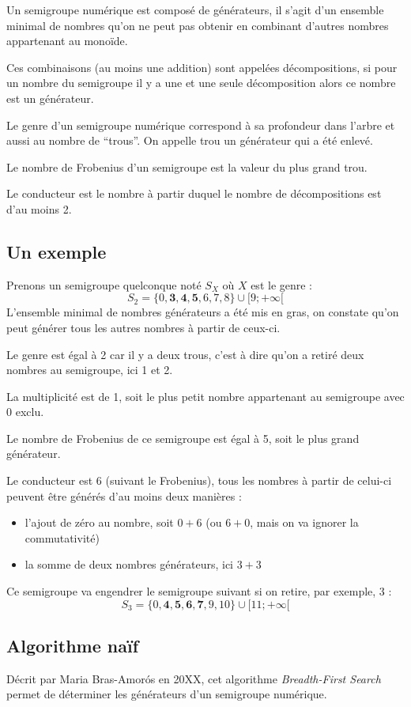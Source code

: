 \documentclass[12pt,a4paper]{article}
\begin{document}
Un semigroupe numérique est composé de générateurs, il s'agit d'un ensemble minimal de nombres qu'on ne peut pas obtenir en combinant d'autres nombres appartenant au monoïde.

Ces combinaisons (au moins une addition) sont appelées décompositions, si pour un nombre du semigroupe il y a une et une seule décomposition alors ce nombre est un générateur.

Le genre d'un semigroupe numérique correspond à sa profondeur dans l'arbre et aussi au nombre de ``trous''. On appelle trou un générateur qui a été enlevé.

Le nombre de Frobenius d'un semigroupe est la valeur du plus grand trou.

Le conducteur est le nombre à partir duquel le nombre de décompositions est d'au moins 2.

\subsection*{Un exemple}

Prenons un semigroupe quelconque noté $S_X$ où $X$ est le genre :
\[ S_2 = \{0, \mathbf{3}, \mathbf{4}, \mathbf{5}, 6, 7, 8\} \cup [9; +\infty[ \]
L'ensemble minimal de nombres générateurs a été mis en gras, on constate qu'on peut générer tous les autres nombres à partir de ceux-ci.

Le genre est égal à 2 car il y a deux trous, c'est à dire qu'on a retiré deux nombres au semigroupe, ici 1 et 2.

La multiplicité est de 1, soit le plus petit nombre appartenant au semigroupe avec 0 exclu.

Le nombre de Frobenius de ce semigroupe est égal à 5, soit le plus grand générateur.

Le conducteur est 6 (suivant le Frobenius), tous les nombres à partir de celui-ci peuvent être générés d'au moins deux manières :
\begin{itemize}
	\item	l'ajout de zéro au nombre, soit $0 + 6$ (ou $6 + 0$, mais on va ignorer la commutativité)
	\item	la somme de deux nombres générateurs, ici $3 + 3$
\end{itemize}

Ce semigroupe va engendrer le semigroupe suivant si on retire, par exemple, 3 :
\[ S_3 = \{ 0, \mathbf{4}, \mathbf{5}, \mathbf{6}, \mathbf{7}, 9, 10 \} \cup [11; +\infty[ \]

\subsection*{Algorithme naïf}
Décrit par Maria Bras-Amorós en 20XX, cet algorithme \emph{Breadth-First Search} permet de déterminer les générateurs d'un semigroupe numérique.
\end{document}
